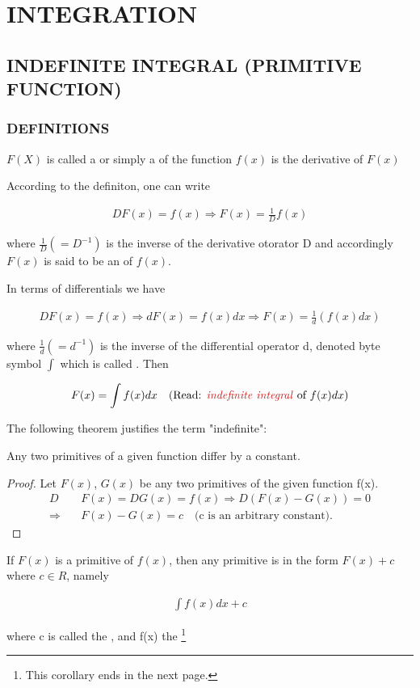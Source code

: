 \documentclass[11pt]{amsbook}
\begin{document}
    	

\chapter{INTEGRATION}
\section{INDEFINITE INTEGRAL (PRIMITIVE FUNCTION)}


\subsection{DEFINITIONS}
$F(X)$ is called a  or simply a  of the function $f(x)$ is the derivative of $F(x)$
\par According to the definiton, one can write

\begin{align*}
	D F(x) = f(x) \Longrightarrow F(x) = \frac{1}{D}f(x)
\end{align*}

\noindent where $\frac{1}{D} (= D^{-1})$ is the inverse of the derivative otorator D and accordingly $F(x)$ is said to be an  of $f(x)$.
\par In terms of differentials we have

\begin{align*}
	D F(x) = f(x) \Longrightarrow dF(x) = f(x)dx \Longrightarrow F(x) = \frac{1}{d} (f(x)dx)
\end{align*}

where $\frac{1}{d}(=d^{-1})$ is the inverse of the differential operator d, denoted byte symbol $\int$ which is called . Then

\begin{align*}
	F(x) = \int f(x)dx \quad \text{(Read: \hDefined{indefinite integral} of $f(x)dx)$}
\end{align*}

\par The following theorem justifies the term "indefinite":

\begin{thm}
	Any two primitives of a given function differ by a constant.
	\begin{proof}
		Let $F(x)$,  $G(x)$ be any two primitives of the given function f(x).
		\begin{align*}
			D &F(x) = D G(x) = f(x) \Longrightarrow D(F(x) - G(x)) = 0 \\
			\Longrightarrow \quad &F(x) - G(x) = c\quad \text{(c is an arbitrary constant).}
		\end{align*}
	\end{proof}
\end{thm}

\begin{cor}
	If $F(x)$ is a primitive of $f(x)$, then any primitive is in the form $F(x) + c$ where $c \in R$, namely

	\begin{align*}
		\int f(x)dx + c
	\end{align*}

	where c is called the , and f(x) the \footnote{This corollary ends in the next page.}
\end{cor}
\end{document}
